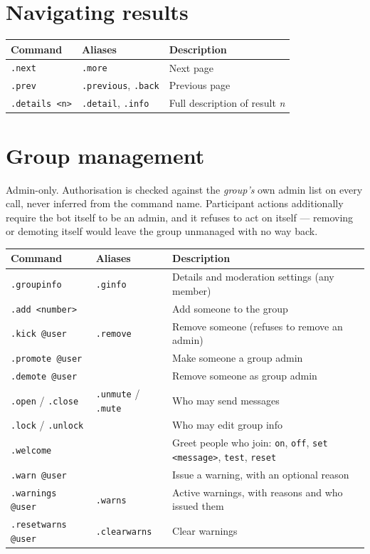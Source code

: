 \documentclass[11pt,a4paper]{report}
\newcommand{\dash}{---}
\begin{document}
\section{Navigating results}

\begin{center}
\begin{tabularx}{\textwidth}{@{}llX@{}}
\toprule
\textbf{Command} & \textbf{Aliases} & \textbf{Description} \\
\midrule
\texttt{.next} & \texttt{.more} & Next page \\
\texttt{.prev} & \texttt{.previous}, \texttt{.back} & Previous page \\
\texttt{.details <n>} & \texttt{.detail}, \texttt{.info} & Full description of
result \emph{n} \\
\bottomrule
\end{tabularx}
\end{center}

\section{Group management}

Admin-only. Authorisation is checked against the \emph{group's} own admin list
on every call, never inferred from the command name. Participant actions
additionally require the bot itself to be an admin, and it refuses to act on
itself \dash{} removing or demoting itself would leave the group unmanaged with
no way back.

\begin{center}
\begin{tabularx}{\textwidth}{@{}llX@{}}
\toprule
\textbf{Command} & \textbf{Aliases} & \textbf{Description} \\
\midrule
\texttt{.groupinfo} & \texttt{.ginfo} & Details and moderation settings (any
member) \\
\texttt{.add <number>} & & Add someone to the group \\
\texttt{.kick @user} & \texttt{.remove} & Remove someone (refuses to remove an
admin) \\
\texttt{.promote @user} & & Make someone a group admin \\
\texttt{.demote @user} & & Remove someone as group admin \\
\texttt{.open} / \texttt{.close} & \texttt{.unmute} / \texttt{.mute} & Who may
send messages \\
\texttt{.lock} / \texttt{.unlock} & & Who may edit group info \\
\texttt{.welcome} & & Greet people who join: \texttt{on}, \texttt{off},
\texttt{set <message>}, \texttt{test}, \texttt{reset} \\
\texttt{.warn @user} & & Issue a warning, with an optional reason \\
\texttt{.warnings @user} & \texttt{.warns} & Active warnings, with reasons and
who issued them \\
\texttt{.resetwarns @user} & \texttt{.clearwarns} & Clear warnings \\
\bottomrule
\end{tabularx}
\end{center}
\end{document}
